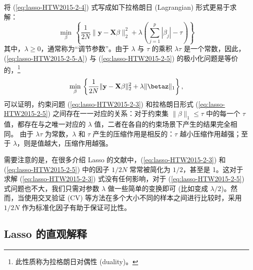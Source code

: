 将 (\ref{eq:lasso-HTW2015-2-4}) 式写成如下拉格朗日 (Lagrangian) 形式更易于求解：
\begin{equation}\label{eq:lasso-HTW2015-2-5-A}
\underset{\beta}{\operatorname{min}}\,
\left\{
    \frac{1}{2 N}\|\mathbf{y}-\mathbf{X} \beta\|_{2}^{2}
   +\lambda\left(\sum_{j=1}^{p}\left|\beta_{j}\right|-\tau\right)
\right\}
\end{equation}
其中，$\lambda \geq 0$，通常称为“调节参数”。由于 $\lambda$ 与 $\tau$ 的乘积 $\lambda \tau$ 是一个常数，因此，(\ref{eq:lasso-HTW2015-2-5-A}) 与 (\ref{eq:lasso-HTW2015-2-5}) 的极小化问题是等价的，\footnote{%
      此性质称为拉格朗日对偶性 (duality)。}
\begin{equation}\label{eq:lasso-HTW2015-2-5}
\underset{\beta}{\operatorname{min}}\,
\left\{\frac{1}{2 N}\|\mathbf{y}-\mathbf{X} \beta\|_{2}^{2}+\lambda\|\betaz\|_{1}\right\},
\end{equation}
可以证明，约束问题 (\ref{eq:lasso-HTW2015-2-3}) 和拉格朗日形式 (\ref{eq:lasso-HTW2015-2-5}) 之间存在一一对应的关系：对于约束集 $\|\beta\|_{1} \leq \tau$ 中的每一个 $\tau$ 值，都存在与之唯一对应的 $\lambda$ 值，二者在各自的约束场景下产生的结果完全相同。
由于 $\lambda \tau$ 为常数，$\lambda$ 和 $\tau$ 产生的压缩作用是相反的：$\tau$ 越小压缩作用越强；至于 $\lambda$，则是值越大，压缩作用越强。



需要注意的是，在很多介绍 Lasso 的文献中，(\ref{eq:lasso-HTW2015-2-3}) 和 (\ref{eq:lasso-HTW2015-2-5}) 中的因子 $1/2N$ 常常被简化为 $1/2$，甚至是 1。这对于求解 (\ref{eq:lasso-HTW2015-2-3}) 式没有任何影响，对于 (\ref{eq:lasso-HTW2015-2-5}) 式问题也不大，我们只需对参数 $\lambda$ 做一些简单的变换即可 (比如变成 $\lambda/2$)。然而，当使用交叉验证 (CV) 等方法在多个大小不同的样本之间进行比较时，采用 $1/2N$ 作为标准化因子有助于保证可比性。 

\subsection{Lasso 的直观解释}

